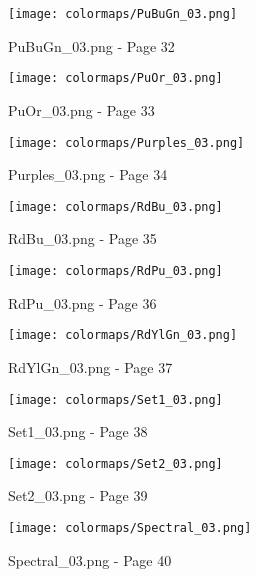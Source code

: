 \documentclass{article}%
\begin{document}
%


\begin{figure}[h!]%
\centering%
\texttt{[image: colormaps/PuBuGn\_03.png]}%
\caption{PuBuGn\_03.png {-} Page 32}%
\end{figure}

%


\begin{figure}[h!]%
\centering%
\texttt{[image: colormaps/PuOr\_03.png]}%
\caption{PuOr\_03.png {-} Page 33}%
\end{figure}

%


\begin{figure}[h!]%
\centering%
\texttt{[image: colormaps/Purples\_03.png]}%
\caption{Purples\_03.png {-} Page 34}%
\end{figure}

%


\begin{figure}[h!]%
\centering%
\texttt{[image: colormaps/RdBu\_03.png]}%
\caption{RdBu\_03.png {-} Page 35}%
\end{figure}

%


\begin{figure}[h!]%
\centering%
\texttt{[image: colormaps/RdPu\_03.png]}%
\caption{RdPu\_03.png {-} Page 36}%
\end{figure}

%


\begin{figure}[h!]%
\centering%
\texttt{[image: colormaps/RdYlGn\_03.png]}%
\caption{RdYlGn\_03.png {-} Page 37}%
\end{figure}

%


\begin{figure}[h!]%
\centering%
\texttt{[image: colormaps/Set1\_03.png]}%
\caption{Set1\_03.png {-} Page 38}%
\end{figure}

%


\begin{figure}[h!]%
\centering%
\texttt{[image: colormaps/Set2\_03.png]}%
\caption{Set2\_03.png {-} Page 39}%
\end{figure}

%


\begin{figure}[h!]%
\centering%
\texttt{[image: colormaps/Spectral\_03.png]}%
\caption{Spectral\_03.png {-} Page 40}%
\end{figure}
\end{document}
